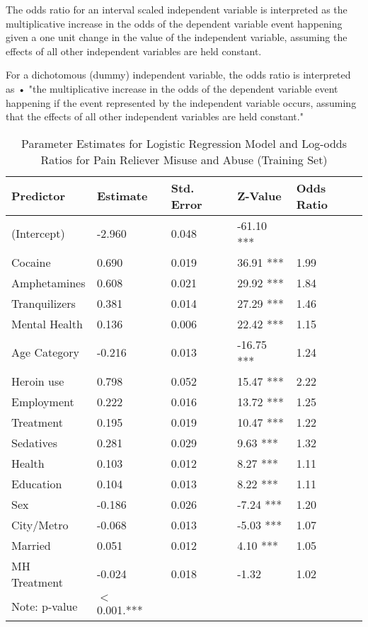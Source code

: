 \documentclass[sigconf]{acmart}
\begin{document}
The odds ratio for an interval scaled independent variable is interpreted as 
the multiplicative increase in the odds of the dependent variable event 
happening given a one unit change in the value of the independent variable,
assuming the effects of all other independent variables are held constant.




For a dichotomous (dummy) independent variable, the odds ratio is interpreted as 
•	"the multiplicative increase in the odds of the dependent variable event happening if the event represented by the independent variable occurs, assuming that the effects of all other independent variables are held constant."  








\begin{table}
  \caption{Parameter Estimates for Logistic Regression Model and Log-odds 
  Ratios for Pain Reliever Misuse and Abuse (Training Set)}
  \label{tab:freq}
  \begin{tabular}{lllll}
    \toprule
    Predictor&  Estimate& Std. Error& Z-Value & Odds Ratio \\    
    \midrule
    (Intercept)   & -2.960 &   0.048 & -61.10 *** &  &  \\
    Cocaine       & 0.690  &   0.019 &  36.91 *** & 1.99  \\
    Amphetamines  & 0.608  &   0.021 &  29.92 *** & 1.84  \\
    Tranquilizers & 0.381  &   0.014 &  27.29 *** & 1.46  \\
    Mental Health & 0.136  &   0.006 &  22.42 *** & 1.15  \\
    Age Category  & -0.216 &   0.013 & -16.75 *** & 1.24  \\
    Heroin use    & 0.798  &   0.052 &  15.47 *** & 2.22  \\  
    Employment    & 0.222  &   0.016 &  13.72 *** & 1.25  \\
    Treatment     & 0.195  &   0.019 &  10.47 *** & 1.22  \\
    Sedatives     & 0.281  &   0.029 &   9.63 *** & 1.32  \\   
    Health        & 0.103  &   0.012 &   8.27 *** & 1.11  \\
    Education     & 0.104  &   0.013 &   8.22 *** & 1.11  \\   
    Sex           & -0.186 &   0.026 &  -7.24 *** & 1.20  \\
    City/Metro    & -0.068 &   0.013 &  -5.03 *** & 1.07  \\
    Married       & 0.051  &   0.012 &   4.10 *** & 1.05  \\
    MH Treatment  & -0.024 &   0.018 &  -1.32     & 1.02  \\
    \bottomrule 
    Note: p-value& $<$ 0.001.***  &  &  &   
  \end{tabular}
\end{table}
\end{document}
